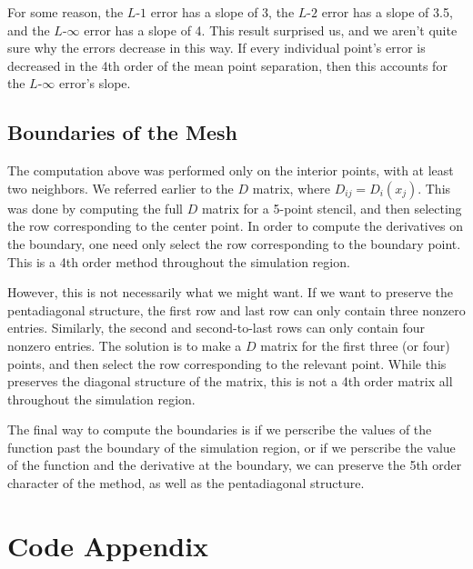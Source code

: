 \documentclass{article}
\begin{document}
For some reason, the $L$-$1$ error has a slope of 3,
	the $L$-$2$ error has a slope of 3.5,
	and the $L$-$\infty$ error has a slope of 4.
This result surprised us, and we aren't quite sure why the errors
	decrease in this way.
If every individual point's error is decreased in the 4th order
	of the mean point separation, then this accounts for the
	$L$-$\infty$ error's slope.

\subsection{Boundaries of the Mesh}

The computation above was performed only on the interior points,
	with at least two neighbors.
We referred earlier to the $D$ matrix, where $D_{ij} = D_i(x_j)$.
This was done by computing the full $D$ matrix for a 5-point stencil,
	and then selecting the row corresponding to the center point.
In order to compute the derivatives on the boundary, one need only select
	the row corresponding to the boundary point.
This is a 4th order method throughout the simulation region.

However, this is not necessarily what we might want.
If we want to preserve the pentadiagonal structure, the first row
	and last row can only contain three nonzero entries.
Similarly, the second and second-to-last rows can only contain four
	nonzero entries.
The solution is to make a $D$ matrix for the first three (or four)
	points, and then select the row corresponding to the relevant point.
While this preserves the diagonal structure of the matrix, this is not
	a  4th order matrix all throughout the simulation region.

The final way to compute the boundaries is if we perscribe the values 
	of the function past the boundary of the simulation region,
	or if we perscribe the value of the function and the derivative
	at the boundary, we can preserve the 5th order character
	of the method, as well as the pentadiagonal structure.

\appendix
\section{Code Appendix}
\lstset{language=python}

\end{document}
